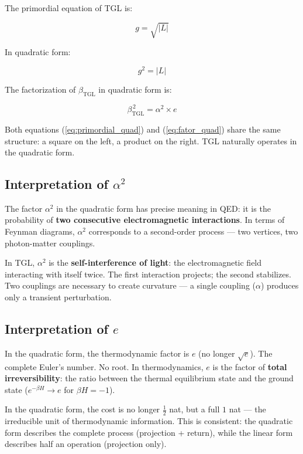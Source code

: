 \documentclass[12pt,a4paper,twoside]{article}
\newcommand{\betatgl}{\beta_{\!\scriptscriptstyle\mathrm{TGL}}}
\begin{document}
The primordial equation of TGL is:

\begin{equation}
g = \sqrt{|L|}
\end{equation}

In quadratic form:

\begin{equation}
g^2 = |L|
\label{eq:primordial_quad}
\end{equation}

The factorization of $\betatgl$ in quadratic form is:

\begin{equation}
\betatgl^{\,2} = \alpha^2 \times e
\label{eq:fator_quad}
\end{equation}

Both equations (\ref{eq:primordial_quad}) and (\ref{eq:fator_quad}) share the same structure: a square on the left, a product on the right. TGL naturally operates in the quadratic form.

\subsection{Interpretation of $\alpha^2$}

The factor $\alpha^2$ in the quadratic form has precise meaning in QED: it is the probability of \textbf{two consecutive electromagnetic interactions}. In terms of Feynman diagrams, $\alpha^2$ corresponds to a second-order process --- two vertices, two photon-matter couplings.

In TGL, $\alpha^2$ is the \textbf{self-interference of light}: the electromagnetic field interacting with itself twice. The first interaction projects; the second stabilizes. Two couplings are necessary to create curvature --- a single coupling ($\alpha$) produces only a transient perturbation.

\subsection{Interpretation of $e$}

In the quadratic form, the thermodynamic factor is $e$ (no longer $\sqrt{e}$). The complete Euler's number. No root. In thermodynamics, $e$ is the factor of \textbf{total irreversibility}: the ratio between the thermal equilibrium state and the ground state ($e^{-\beta H} \to e$ for $\beta H = -1$).

In the quadratic form, the cost is no longer $\frac{1}{2}$ nat, but a full $1$ nat --- the irreducible unit of thermodynamic information. This is consistent: the quadratic form describes the complete process (projection + return), while the linear form describes half an operation (projection only).
\end{document}
